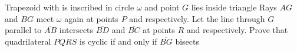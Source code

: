 Trapezoid  with  is inscribed in circle $ \omega$ and point $ G$ lies inside triangle   Rays $ AG$ and $ BG$ meet $ \omega$ again at points $ P$ and  respectively.  Let the line through $ G$ parallel to $ \overline{AB}$ intersects $ \overline{BD}$ and $ \overline{BC}$ at points $ R$ and  respectively.  Prove that quadrilateral $ PQRS$ is cyclic if and only if $ \overline{BG}$ bisects 